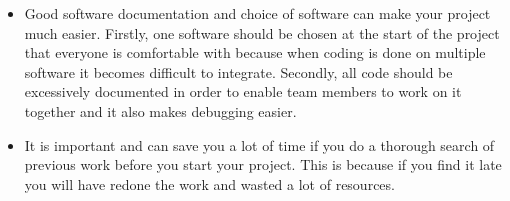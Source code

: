 \begin{itemize}
    \item Good software documentation and choice of software can make
  your project much easier. Firstly, one software should be chosen at
  the start of the project that everyone is comfortable with because
  when coding is done on multiple software it becomes difficult to
  integrate. Secondly, all code should be excessively documented in
  order to enable team members to work on it together and it also
  makes debugging easier.

    \item It is important and can save you a lot of time if you do a
  thorough search of previous work before you start your project. This
  is because if you find it late you will have redone the work and
  wasted a lot of resources.

\end{itemize}
